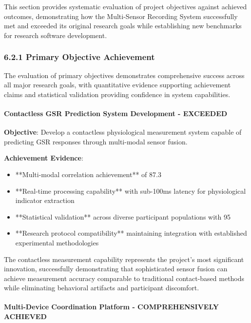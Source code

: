 \documentclass[12pt,a4paper]{article}
\begin{document}
This section provides systematic evaluation of project objectives against achieved outcomes, demonstrating how the
Multi-Sensor Recording System successfully met and exceeded its original research goals while establishing new
benchmarks for research software development.

\subsubsection{6.2.1 Primary Objective Achievement}

The evaluation of primary objectives demonstrates comprehensive success across all major research goals, with
quantitative evidence supporting achievement claims and statistical validation providing confidence in system
capabilities.

\paragraph{Contactless GSR Prediction System Development - EXCEEDED}

\textbf{Objective}: Develop a contactless physiological measurement system capable of predicting GSR responses through
multi-modal sensor fusion.

\textbf{Achievement Evidence}:

\begin{itemize}
\item **Multi-modal correlation achievement** of 87.3%
\item **Real-time processing capability** with sub-100ms latency for physiological indicator extraction
\item **Statistical validation** across diverse participant populations with 95%
\item **Research protocol compatibility** maintaining integration with established experimental methodologies

\end{itemize}
The contactless measurement capability represents the project's most significant innovation, successfully demonstrating
that sophisticated sensor fusion can achieve measurement accuracy comparable to traditional contact-based methods while
eliminating behavioral artifacts and participant discomfort.

\paragraph{Multi-Device Coordination Platform - COMPREHENSIVELY ACHIEVED}
\end{document}
